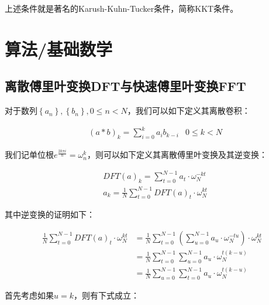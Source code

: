 \documentclass[UTF8]{book}
\begin{document}
上述条件就是著名的Karush-Kuhn-Tucker条件，简称KKT条件。

\section{算法/基础数学}

\subsection{离散傅里叶变换DFT与快速傅里叶变换FFT}
对于数列$\left \{ a_n \right \}, \left \{ b_n \right \},0 \le n < N$，我们可以如下定义其离散卷积：
\begin{large}
    \begin{equation}
        \begin{aligned}
            &\left ( a*b \right )_k=\sum_{i=0}^{k}{a_ib_{k-i}} & 0 \le k < N
            \nonumber
        \end{aligned}
    \end{equation}
\end{large}
我们记单位根$e^{\frac{2k\pi i}{n}}=\omega_{n}^k$，则可以如下定义其离散傅里叶变换及其逆变换：
\begin{large}
    \begin{equation}
        \begin{aligned}
            &DFT(a)_k=\sum_{t=0}^{N-1}{a_t \cdot \omega_{N}^{-kt}} \\
            &a_k=\frac{1}{N}\sum_{t=0}^{N-1}{DFT(a)_t \cdot \omega_{N}^{kt}}
            \nonumber
        \end{aligned}
    \end{equation}
\end{large}
其中逆变换的证明如下：
\begin{large}
    \begin{equation}
        \begin{aligned}
            \frac{1}{N}\sum_{t=0}^{N-1}{DFT(a)_t \cdot \omega_{N}^{kt}} &= \frac{1}{N}\sum_{t=0}^{N-1}\left ( \sum_{u=0}^{N-1}a_u \cdot \omega_N^{-tu} \right ) \cdot \omega_{N}^{kt} \\
            &= \frac{1}{N}\sum_{t=0}^{N-1}\sum_{u=0}^{N-1}a_u \cdot \omega_N^{t(k-u)} \\
            &= \frac{1}{N}\sum_{u=0}^{N-1}\sum_{t=0}^{N-1}a_u \cdot \omega_N^{t(k-u)}
            \nonumber
        \end{aligned}
    \end{equation}
\end{large}
首先考虑如果$u=k$，则有下式成立：
\end{document}
